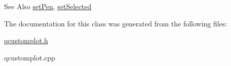 \begin{DoxySeeAlso}{See Also}
\hyperlink{classQCPItemPixmap_acdade1305edb4b5cae14f97fd132065f}{set\-Pen}, \hyperlink{classQCPAbstractItem_a203de94ad586cc44d16c9565f49d3378}{set\-Selected} 
\end{DoxySeeAlso}


The documentation for this class was generated from the following files\-:\begin{DoxyCompactItemize}
\item 
\hyperlink{qcustomplot_8h}{qcustomplot.\-h}\item 
qcustomplot.\-cpp\end{DoxyCompactItemize}
